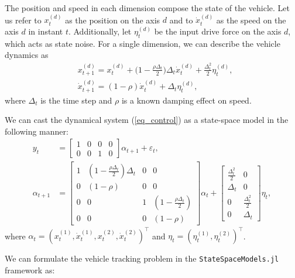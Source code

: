 \documentclass{juliacon}
\begin{document}
The position and speed in each dimension compose the state of the vehicle. Let us refer to $x_t^{(d)}$ as the position on the axis $d$ and to $\dot{x}^{(d)}_t$ as the speed on the axis $d$ in instant $t$. Additionally, let $\eta^{(d)}_t$ be the input drive force on the axis $d$, which acts as state noise. For a single dimension, we can describe the vehicle dynamics as 
\begin{equation}
\begin{aligned}
    & x_{t+1}^{(d)} = x_t^{(d)} + \Big( 1 - \frac{\rho \Delta_t}{2} \Big) \Delta_t \dot{x}^{(d)}_t + \frac{\Delta^2_t}{2} \eta_t^{(d)}, \\
    & \dot{x}^{(d)}_{t+1} = (1 - \rho) \dot{x}^{(d)}_{t} + \Delta_t \eta^{(d)}_t,
\end{aligned}\label{eq_control}
\end{equation}
where $\Delta_t$ is the time step and $\rho$ is a known damping effect on speed. 

We can cast the dynamical system (\ref{eq_control}) as a state-space model in the following manner:
\begin{align*} 
    y_t &= \begin{bmatrix} 1 & 0 & 0 & 0 \\ 0 & 0 & 1 & 0 \end{bmatrix} \alpha_{t+1} + \varepsilon_t, \\
    \alpha_{t+1} &= \begin{bmatrix} 1 & (1 - \tfrac{\rho \Delta_t}{2}) \Delta_t & 0 & 0 \\ 0 & (1 - \rho) & 0 & 0 \\ 0 & 0 & 1 & (1 - \tfrac{\rho \Delta_t}{2}) \\ 0 & 0 & 0 & (1 - \rho) \end{bmatrix} \alpha_{t} + \begin{bmatrix} \tfrac{\Delta^2_t}{2} & 0 \\ \Delta_t & 0 \\ 0 & \tfrac{\Delta^2_t}{2} \\ 0 & \Delta_t \end{bmatrix} \eta_{t},
\end{align*}
where $\alpha_t = (x_t^{(1)}, \dot{x}^{(1)}_{t}, x_t^{(2)}, \dot{x}^{(2)}_{t})^{\top}$ and $\eta_t = (\eta^{(1)}_t, \eta^{(2)}_t)^{\top}$.

\vspace{0.3cm}

We can formulate the vehicle tracking problem in the \texttt{StateSpaceModels.jl} framework as:
\end{document}
